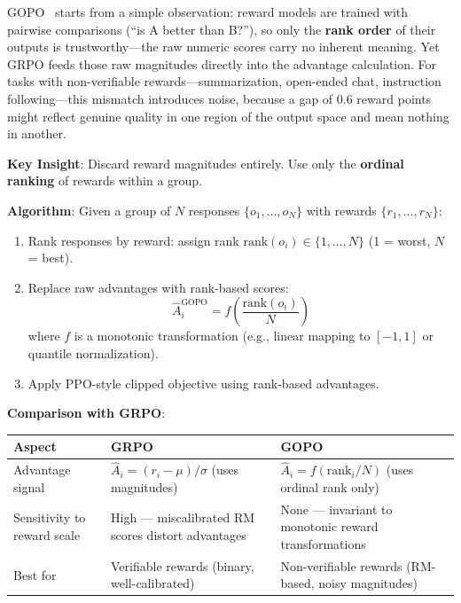 GOPO~\cite{choi2025gopo} starts from a simple observation: reward models are trained with pairwise comparisons (``is A better than B?''), so only the \textbf{rank order} of their outputs is trustworthy---the raw numeric scores carry no inherent meaning. Yet GRPO feeds those raw magnitudes directly into the advantage calculation. For tasks with non-verifiable rewards---summarization, open-ended chat, instruction following---this mismatch introduces noise, because a gap of 0.6 reward points might reflect genuine quality in one region of the output space and mean nothing in another.

\textbf{Key Insight}: Discard reward magnitudes entirely. Use only the \textbf{ordinal ranking} of rewards within a group.

\textbf{Algorithm}: Given a group of $N$ responses $\{o_1, \ldots, o_N\}$ with rewards $\{r_1, \ldots, r_N\}$:

\begin{enumerate}
  \item Rank responses by reward: assign rank $\text{rank}(o_i) \in \{1, \ldots, N\}$ (1 = worst, $N$ = best).
  \item Replace raw advantages with rank-based scores: 
\begin{equation}
\boxed{\hat{A}_i^{\text{GOPO}} = f\!\left(\frac{\text{rank}(o_i)}{N}\right)}
\end{equation}
 where $f$ is a monotonic transformation (e.g., linear mapping to $[-1, 1]$ or quantile normalization).
  \item Apply PPO-style clipped objective using rank-based advantages.
\end{enumerate}

\textbf{Comparison with GRPO}:

\begin{tabular}{@{}lp{5cm}p{8cm}@{}}
\toprule
\textbf{Aspect} & \textbf{GRPO} & \textbf{GOPO} \\
\midrule
Advantage signal & $\hat{A}_i = (r_i - \mu)/\sigma$ (uses magnitudes) & $\hat{A}_i = f(\text{rank}_i / N)$ (uses ordinal rank only) \\
Sensitivity to reward scale & High --- miscalibrated RM scores distort advantages & None --- invariant to monotonic reward transformations \\
Best for & Verifiable rewards (binary, well-calibrated) & Non-verifiable rewards (RM-based, noisy magnitudes) \\
\bottomrule
\end{tabular}

